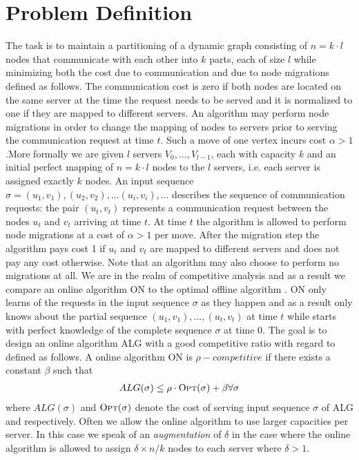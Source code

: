 \documentclass[xcolor=dvipsnames, tikz, 11pt]{article}
\newcommand{\nl}{\newline}
\newcommand{\opt}{\text{O{\scriptsize PT}}}
\theoremstyle{definition}
\begin{document}
	
	\section{Problem Definition}
	The task is to maintain a partitioning of a dynamic graph consisting of $n=k\cdot l$ nodes that communicate with each other into $k$ parts, each of size $l$ while minimizing both the cost due to communication and due to node migrations defined as follows. The communication cost is zero if both nodes are located on the same server at the time the request needs to be served and it is normalized to one if they are mapped to different servers. An algorithm may perform node migrations in order to change the mapping of nodes to servers prior to serving the communication request at time $t$. Such a move of one vertex incurs cost $\alpha>1$.\nl More formally we are given $l$ servers $V_0,...,V_{l-1}$, each with capacity $k$ and an initial perfect mapping of $n=k\cdot l$ nodes to the $l$ servers, i.e. each server is assigned exactly $k$ nodes. An input sequence $\sigma=(u_1, v_1), (u_2, v_2),...(u_i,v_i),...$ describes the sequence of communication requests: the pair $(u_t, v_t)$ represents a communication request between the nodes $u_t$ and $v_t$ arriving at time $t$. At time $t$ the algorithm is allowed to perform node migrations at a cost of $\alpha>1$ per move. After the migration step the algorithm pays cost 1 if $u_t$ and $v_t$ are mapped to different servers and does not pay any cost otherwise. Note that an algorithm may also choose to perform no migrations at all.\nl
	We are in the realm of competitive analysis and as a result we compare an online algorithm ON to the optimal offline algorithm \opt{}. ON only learns of the requests in the input sequence $\sigma$ as they happen and as a result only knows about the partial sequence $(u_1,v_1),...,(u_t,v_t)$ at time $t$ while \opt{} starts with perfect knowledge of the complete sequence $\sigma$ at time $0$.\nl
	The goal is to design an online algorithm ALG with a good competitive ratio with regard to \opt{} defined as follows.\nl
	A online algorithm ON is $\rho-competitive$ if there exists a constant $\beta$ such that \begin{align*}
	ALG(\sigma)\leq\rho\cdot \opt{}(\sigma)+\beta\forall \sigma
	\end{align*} 
	where $ALG(\sigma)$ and $\opt{}(\sigma)$ denote the cost of serving input sequence $\sigma$ of ALG and \opt{} respectively.\nl
	Often we allow the online algorithm to use larger capacities per server. In this case we speak of an \textit{augmentation} of $\delta$ in the case where the online algorithm is allowed to assign $\delta\times n/k$ nodes to each server where $\delta>1$.%
	
\end{document}
